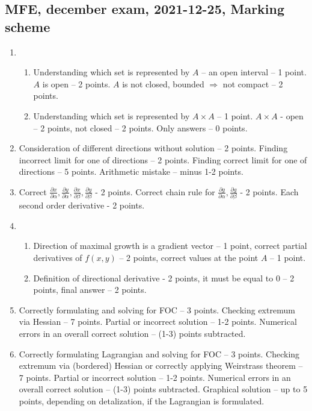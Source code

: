 \subsection{MFE, december exam, 2021-12-25, Marking scheme}
\begin{enumerate}

  \item 
      \begin{enumerate}

          \item Understanding which set is represented by $A$ – an open interval – 1 point.
   $A$ is open – 2 points.
   $A$   is not closed, bounded $\Rightarrow$ not compact – 2 points.
          \item Understanding which set is represented by  $A\times A$  – 1 point.
     $A\times A$  - open – 2 points, not closed – 2 points.  Only answers – 0 points.
      \end{enumerate}
  \item Consideration of different directions without solution – 2 points. 
  Finding incorrect limit for one of directions – 2 points. 
  Finding correct limit for one of directions – 5 points. 
  Arithmetic mistake – minus 1-2 points.

  \item Correct $\frac{\partial x}{\partial \alpha},\frac{\partial y}{\partial  \alpha},\frac{\partial x}{\partial \beta},\frac{\partial y}{\partial \beta}$ - 2 points. 
  Correct chain rule for $\frac{\partial g}{\partial \alpha}, \frac{\partial g}{\partial \beta}$ - 2 points. 
  Each second order derivative - 2 points.
  \item 
      \begin{enumerate} 
          \item Direction of maximal growth is a gradient vector – 1 point, correct partial derivatives of $f(x,y)$ – 2 points, correct values at the point $A$ – 1 point.
          \item Definition of directional derivative - 2 points, it must be equal to 0 – 2 points, final answer – 2 points.
      \end{enumerate}
  \item Correctly formulating and solving for FOC – 3 points. 
  Checking extremum via Hessian – 7 points. Partial or incorrect solution – 1-2 points. 
  Numerical errors in an overall correct solution – (1-3) points subtracted. 
  \item Correctly formulating Lagrangian and solving for FOC – 3 points.
Checking extremum via (bordered) Hessian or correctly applying Weirstrass theorem – 7 points. 
Partial or incorrect solution – 1-2 points.
Numerical errors in an overall correct solution – (1-3) points subtracted.
Graphical solution – up to 5 points, depending on detalization, if the Lagrangian is formulated.


\end{enumerate}
